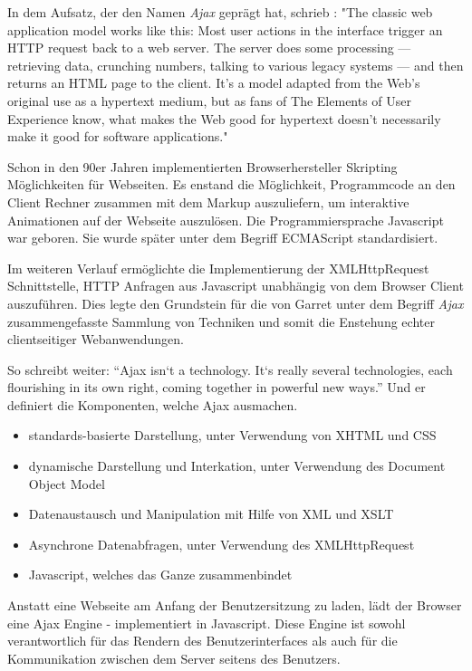 In dem Aufsatz, der den Namen \emph{Ajax} geprägt hat, schrieb \cite{Garrett:2005}: "The classic web application model works like this: Most user actions in the interface trigger an HTTP request back to a web server. The server does some processing — retrieving data, crunching numbers, talking to various legacy systems — and then returns an HTML page to the client. It’s a model adapted from the Web’s original use as a hypertext medium, but as fans of The Elements of User Experience know, what makes the Web good for hypertext doesn’t necessarily make it good for software applications."

Schon in den 90er Jahren implementierten Browserhersteller Skripting Möglichkeiten für Webseiten. Es enstand die Möglichkeit, Programmcode an den Client Rechner zusammen mit dem Markup auszuliefern, um interaktive Animationen auf der Webseite auszulösen. Die Programmiersprache Javascript war geboren. Sie wurde später unter dem Begriff ECMAScript standardisiert.

Im weiteren Verlauf ermöglichte die Implementierung der XMLHttpRequest Schnittstelle, HTTP Anfragen aus Javascript unabhängig von dem Browser Client auszuführen. Dies legte den Grundstein für die von Garret unter dem Begriff \emph{Ajax} zusammengefasste Sammlung von Techniken und somit die Enstehung echter clientseitiger Webanwendungen.

So schreibt \cite{Garrett:2005} weiter: \enquote{Ajax isn`t a technology. It`s really several technologies, each flourishing in its own right, coming together in powerful new ways.} Und er definiert die Komponenten, welche Ajax ausmachen.

\begin{itemize} 
\item standards-basierte Darstellung, unter Verwendung von XHTML und CSS 
\item dynamische Darstellung und Interkation, unter Verwendung des Document Object Model
\item Datenaustausch und Manipulation mit Hilfe von XML und XSLT
\item Asynchrone Datenabfragen, unter Verwendung des XMLHttpRequest
\item Javascript, welches das Ganze zusammenbindet
\end{itemize}

Anstatt eine Webseite am Anfang der Benutzersitzung zu laden, lädt der Browser eine Ajax Engine - implementiert in Javascript. Diese Engine ist sowohl verantwortlich für das Rendern des Benutzerinterfaces als auch für die Kommunikation zwischen dem Server seitens des Benutzers. 

